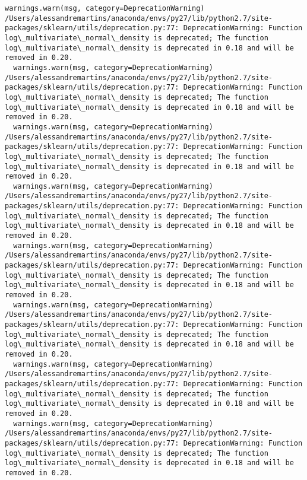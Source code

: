 \documentclass[11pt]{article}
\begin{document}
\begin{Verbatim}[commandchars=\\\{\}]
  warnings.warn(msg, category=DeprecationWarning)
/Users/alessandremartins/anaconda/envs/py27/lib/python2.7/site-packages/sklearn/utils/deprecation.py:77: DeprecationWarning: Function log\_multivariate\_normal\_density is deprecated; The function log\_multivariate\_normal\_density is deprecated in 0.18 and will be removed in 0.20.
  warnings.warn(msg, category=DeprecationWarning)
/Users/alessandremartins/anaconda/envs/py27/lib/python2.7/site-packages/sklearn/utils/deprecation.py:77: DeprecationWarning: Function log\_multivariate\_normal\_density is deprecated; The function log\_multivariate\_normal\_density is deprecated in 0.18 and will be removed in 0.20.
  warnings.warn(msg, category=DeprecationWarning)
/Users/alessandremartins/anaconda/envs/py27/lib/python2.7/site-packages/sklearn/utils/deprecation.py:77: DeprecationWarning: Function log\_multivariate\_normal\_density is deprecated; The function log\_multivariate\_normal\_density is deprecated in 0.18 and will be removed in 0.20.
  warnings.warn(msg, category=DeprecationWarning)
/Users/alessandremartins/anaconda/envs/py27/lib/python2.7/site-packages/sklearn/utils/deprecation.py:77: DeprecationWarning: Function log\_multivariate\_normal\_density is deprecated; The function log\_multivariate\_normal\_density is deprecated in 0.18 and will be removed in 0.20.
  warnings.warn(msg, category=DeprecationWarning)
/Users/alessandremartins/anaconda/envs/py27/lib/python2.7/site-packages/sklearn/utils/deprecation.py:77: DeprecationWarning: Function log\_multivariate\_normal\_density is deprecated; The function log\_multivariate\_normal\_density is deprecated in 0.18 and will be removed in 0.20.
  warnings.warn(msg, category=DeprecationWarning)
/Users/alessandremartins/anaconda/envs/py27/lib/python2.7/site-packages/sklearn/utils/deprecation.py:77: DeprecationWarning: Function log\_multivariate\_normal\_density is deprecated; The function log\_multivariate\_normal\_density is deprecated in 0.18 and will be removed in 0.20.
  warnings.warn(msg, category=DeprecationWarning)
/Users/alessandremartins/anaconda/envs/py27/lib/python2.7/site-packages/sklearn/utils/deprecation.py:77: DeprecationWarning: Function log\_multivariate\_normal\_density is deprecated; The function log\_multivariate\_normal\_density is deprecated in 0.18 and will be removed in 0.20.
  warnings.warn(msg, category=DeprecationWarning)
/Users/alessandremartins/anaconda/envs/py27/lib/python2.7/site-packages/sklearn/utils/deprecation.py:77: DeprecationWarning: Function log\_multivariate\_normal\_density is deprecated; The function log\_multivariate\_normal\_density is deprecated in 0.18 and will be removed in 0.20.

\end{Verbatim}
\end{document}
